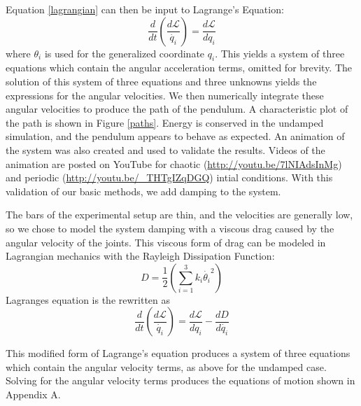 Equation \ref{lagrangian} can then be input to Lagrange's Equation:
\begin{equation}
\frac{d}{dt}(\frac{d\mathcal{L}}{\dot{q_i}})=\frac{d\mathcal{L}}{dq_i}
\end{equation}
where $\theta _i$ is used for the generalized coordinate $q_i$. This yields a system of three equations which contain the angular acceleration terms, omitted for brevity. The solution of this system of three equations and three unknowns yields the expressions for the angular velocities. We then numerically integrate these angular velocities to produce the path of the pendulum. A characteristic plot of the path is shown in Figure \ref{paths}. Energy is conserved in the undamped simulation, and the pendulum appears to behave as expected.  An animation of the system was also created and used to validate the results.  Videos of the animation are posted on YouTube for chaotic (\href{http://youtu.be/7lNIAdsInMg}{http://youtu.be/7lNIAdsInMg}) and periodic (\href{http://youtu.be/_THTgIZqDGQ}{http://youtu.be/_THTgIZqDGQ}) intial conditions.  With this validation of our basic methods, we add damping to the system. 

The bars of the experimental setup are thin, and the velocities are generally low, so we chose to model the system damping with a viscous drag caused by the angular velocity of the joints. This viscous form of drag can be modeled in Lagrangian mechanics with the Rayleigh Dissipation Function:
\begin{equation}
D = \frac{1}{2}(\displaystyle\sum_{i=1}^{3}k_i\dot{\theta _i}^2)
\end{equation}
Lagranges equation is the rewritten as
\begin{equation}
\frac{d}{dt}(\frac{d\mathcal{L}}{\dot{q_i}})=\frac{d\mathcal{L}}{dq_i}-\frac{dD}{d\dot{q_i}}
\end{equation}

This modified form of Lagrange's equation produces a system of three equations which contain the angular velocity terms, as above for the undamped case. Solving for the angular velocity terms produces the equations of motion shown in Appendix A.



